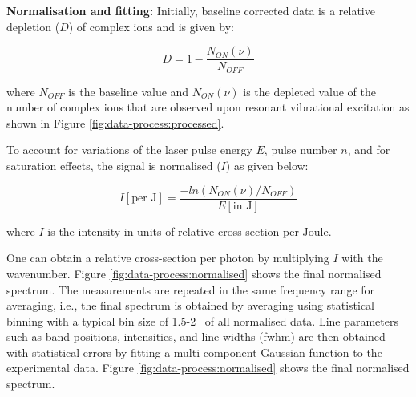 \textbf{Normalisation and fitting:} Initially, baseline corrected data is a relative depletion ($D$) of complex ions and is given by:

\[ D= 1 - \frac{N_{ON}(\nu)}{N_{OFF}} \] 

where $N_{OFF}$ is the baseline value and $N_{ON}(\nu)$ is the depleted value of the number of complex ions that are observed upon resonant vibrational excitation as shown in Figure \ref{fig:data-process:processed}.

To account for variations of the laser pulse energy $E$, pulse number $n$, and for saturation effects, the signal is normalised ($I$) as given below: 

\[ I [\text{per J}]=\frac{- ln(N_{ON}(\nu)/N_{OFF})}{E[\text{in J}]} \]

where $I$ is the intensity in units of relative cross-section per Joule. 

One can obtain a relative cross-section per photon by multiplying $I$ with the wavenumber. Figure \ref{fig:data-process:normalised} shows the final normalised spectrum. The measurements are repeated in the same frequency range for averaging, i.e., the final spectrum is obtained by averaging using statistical binning with a typical bin size of 1.5-2 \wn\ of all normalised data. Line parameters such as band positions, intensities, and line widths (fwhm) are then obtained with statistical errors by fitting a multi-component Gaussian function to the experimental data. Figure \ref{fig:data-process:normalised} shows the final normalised spectrum.
